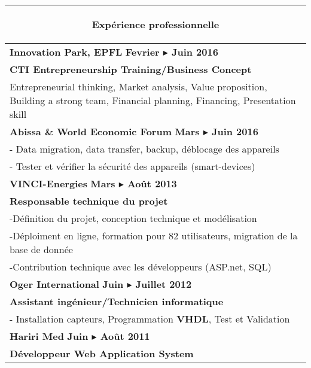 \documentclass[a4paper,10pt]{article}
\begin{document}
\begin{minipage}[t]{0.45\textwidth}
\begin{table}[H]
\small

\begin{tabular}[t]{ m{100mm}}
\multicolumn{1}{c}{\color{burgundy}\scshape\LARGE\raggedright Exp\'erience professionnelle}\\ \hline
\rowcolor{rowcolora}
\textbf{Innovation Park, EPFL } \hfill \bf{Fevrier $\blacktriangleright$ Juin 2016} \\
\rowcolor{rowcolora}\bf{CTI Entrepreneurship Training/Business Concept}\\ 

Entrepreneurial thinking, Market analysis, 
Value proposition, Building a strong team, Financial planning, Financing,
Presentation skill\\
\hline 
\hline
\rowcolor{rowcolora}
\textbf{Abissa \& World Economic Forum} \hfill \bf{Mars $\blacktriangleright$ Juin 2016} \\ 

- \quad Data migration, data transfer, backup, déblocage des appareils \\
- \quad Tester et vérifier la sécurité des appareils (smart-devices)\\
\hline 
\hline
\rowcolor{rowcolora}\textbf{VINCI-Energies} \hfill \bf{Mars $\blacktriangleright$ Ao\^ut 2013} \\
\rowcolor{rowcolora}\bf{Responsable technique du projet}\\ 

-\quad D\'efinition du projet, conception technique et mod\'elisation\\
-\quad D\'eploiment en ligne, formation pour 82 utilisateurs,
migration de la base de donnée \\
-\quad Contribution technique avec les développeurs (ASP.net, SQL)\vspace{-.01cm} \\
\hline \hline
\rowcolor{rowcolora}\textbf{Oger International} \hfill \bf{Juin  $\blacktriangleright$ Juillet 2012} \\
\rowcolor{rowcolora}\bf{Assistant ing\'enieur/Technicien informatique}\\ 

- \quad Installation capteurs, Programmation \textbf{VHDL}, Test et Validation\\
\hline \hline
\rowcolor{rowcolora}\textbf{Hariri Med} \hfill \bf{Juin  $\blacktriangleright$ Ao\^ut 2011} \\
\rowcolor{rowcolora}\bf{D\'eveloppeur  Web Application System}\\ 


\end{tabular}
\end{table}
\end{minipage}
\end{document}
